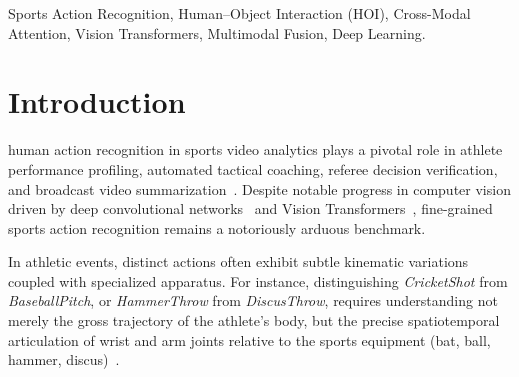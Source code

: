 \documentclass[10pt,journal,compsoc]{IEEEtran}
\begin{document}
{\begin{IEEEkeywords}
Sports Action Recognition, Human--Object Interaction (HOI), Cross-Modal Attention, Vision Transformers, Multimodal Fusion, Deep Learning.
\end{IEEEkeywords}}

\maketitle
\IEEEdisplaynontitleabstractindextext
\IEEEpeerreviewmaketitle

\section{Introduction}
 human action recognition in sports video analytics plays a pivotal role in athlete performance profiling, automated tactical coaching, referee decision verification, and broadcast video summarization~\cite{soomro2012ucf101}. Despite notable progress in computer vision driven by deep convolutional networks~\cite{he2016deep, carreira2017quo} and Vision Transformers~\cite{vaswani2017attention, liu2022video}, fine-grained sports action recognition remains a notoriously arduous benchmark.

In athletic events, distinct actions often exhibit subtle kinematic variations coupled with specialized apparatus. For instance, distinguishing \textit{CricketShot} from \textit{BaseballPitch}, or \textit{HammerThrow} from \textit{DiscusThrow}, requires understanding not merely the gross trajectory of the athlete's body, but the precise spatiotemporal articulation of wrist and arm joints relative to the sports equipment (bat, ball, hammer, discus)~\cite{chao2018rethinking}.
\end{document}
